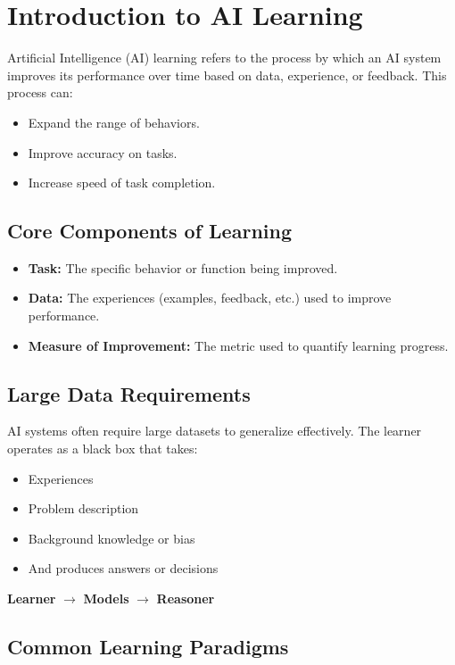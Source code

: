 
\section{Introduction to AI Learning}

Artificial Intelligence (AI) learning refers to the process by which an AI system improves its performance over time based on data, experience, or feedback. This process can:

\begin{itemize}
    \item Expand the range of behaviors.
    \item Improve accuracy on tasks.
    \item Increase speed of task completion.
\end{itemize}

\subsection{Core Components of Learning}

\begin{itemize}
    \item \textbf{Task:} The specific behavior or function being improved.
    \item \textbf{Data:} The experiences (examples, feedback, etc.) used to improve performance.
    \item \textbf{Measure of Improvement:} The metric used to quantify learning progress.
\end{itemize}

\subsection{Large Data Requirements}

AI systems often require large datasets to generalize effectively. The learner operates as a black box that takes:

\begin{itemize}
    \item Experiences
    \item Problem description
    \item Background knowledge or bias
    \item And produces answers or decisions
\end{itemize}

\textbf{Learner} $\rightarrow$ \textbf{Models} $\rightarrow$ \textbf{Reasoner}

\subsection{Common Learning Paradigms}

